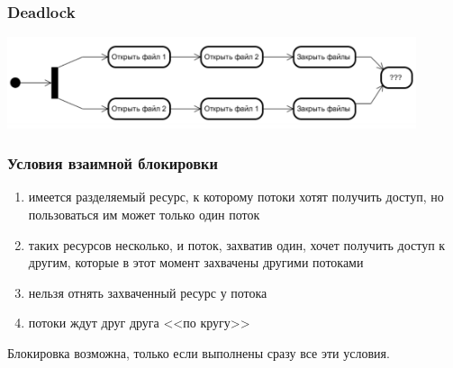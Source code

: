 \documentclass{../../slides-style}
\begin{document}
    \begin{frame}[plain]
        \titlepage
    \end{frame}

    \begin{frame}
        \frametitle{Deadlock}
        \begin{center}
            \includegraphics[width=0.9\textwidth]{deadlock.png}
        \end{center}
    \end{frame}
    
    \begin{frame}
        \frametitle{Условия взаимной блокировки}
        \begin{enumerate}
            \item имеется разделяемый ресурс, к которому потоки хотят получить доступ, но пользоваться им может только один поток
            \item таких ресурсов несколько, и поток, захватив один, хочет получить доступ к другим, которые в этот момент захвачены другими потоками
            \item нельзя отнять захваченный ресурс у потока
            \item потоки ждут друг друга <<по кругу>>
        \end{enumerate}
        Блокировка возможна, только если выполнены сразу все эти условия.
    \end{frame}
\end{document}
